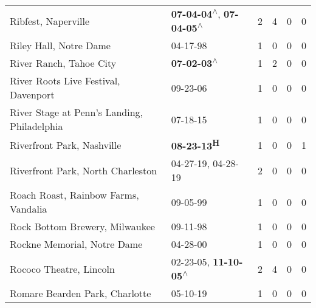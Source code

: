 \begin{supertabular}{p{0.4\textwidth}p{0.3\textwidth}p{0.05\textwidth}p{0.05\textwidth}p{0.05\textwidth}p{0.05\textwidth}}
                                                          Ribfest, Naperville &    \textbf{07-04-04\textsuperscript{$\wedge$}}, \textbf{07-04-05\textsuperscript{$\wedge$}} &  2 &  4 &  0 &  0 \\
                                                       Riley Hall, Notre Dame &                                                                  04-17-98\textsuperscript{} &  1 &  0 &  0 &  0 \\
                                                      River Ranch, Tahoe City &                                                 \textbf{07-02-03\textsuperscript{$\wedge$}} &  1 &  2 &  0 &  0 \\
                                         River Roots Live Festival, Davenport &                                                                  09-23-06\textsuperscript{} &  1 &  0 &  0 &  0 \\
                                  River Stage at Penn's Landing, Philadelphia &                                                                  07-18-15\textsuperscript{} &  1 &  0 &  0 &  0 \\
                                                   Riverfront Park, Nashville &                                                        \textbf{08-23-13\textsuperscript{H}} &  1 &  0 &  0 &  1 \\
                                            Riverfront Park, North Charleston &                                      04-27-19\textsuperscript{}, 04-28-19\textsuperscript{} &  2 &  0 &  0 &  0 \\
                                         Roach Roast, Rainbow Farms, Vandalia &                                                                  09-05-99\textsuperscript{} &  1 &  0 &  0 &  0 \\
                                               Rock Bottom Brewery, Milwaukee &                                                                  09-11-98\textsuperscript{} &  1 &  0 &  0 &  0 \\
                                                  Rockne Memorial, Notre Dame &                                                                  04-28-00\textsuperscript{} &  1 &  0 &  0 &  0 \\
                                                      Rococo Theatre, Lincoln &                     02-23-05\textsuperscript{}, \textbf{11-10-05\textsuperscript{$\wedge$}} &  2 &  4 &  0 &  0 \\
                                               Romare Bearden Park, Charlotte &                                                                  05-10-19\textsuperscript{} &  1 &  0 &  0 &  0 \\

\end{supertabular}
